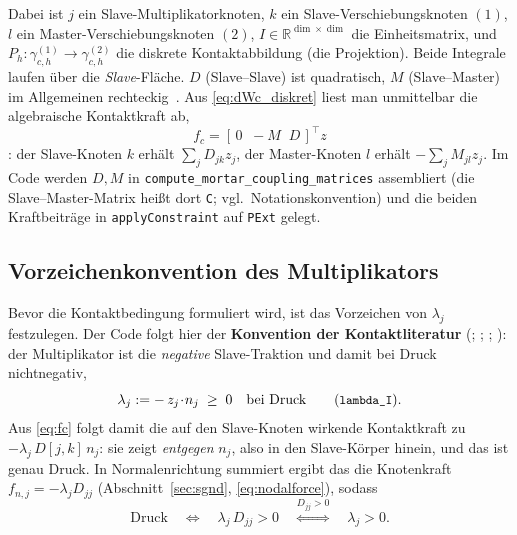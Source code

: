 \documentclass[a4paper,11pt]{article}
\def\bm#1{#1}%
\def\tilde#1{#1}%
\newcommand{\code}[1]{\texttt{\small #1}}
\begin{document}
Dabei ist $j$ ein Slave-Multiplikatorknoten, $k$ ein Slave-Verschiebungsknoten $(1)$, $l$ ein
Master-Verschiebungsknoten $(2)$, $\bm I\in\mathbb R^{\dim\times\dim}$ die Einheitsmatrix, und
$P_h:\gamma_{c,h}^{(1)}\!\to\!\gamma_{c,h}^{(2)}$ die diskrete Kontaktabbildung (die Projektion). Beide
Integrale laufen über die \emph{Slave}-Fläche. $\bm D$ (Slave--Slave) ist quadratisch, $\bm M$
(Slave--Master) im Allgemeinen rechteckig~\citep[S.~B427]{popp2012}. Aus \eqref{eq:dWc_diskret}
liest man unmittelbar die algebraische Kontaktkraft ab,
\begin{equation}
\bm f_c = [\,\bm 0\;\;-\bm M\;\;\bm D\,]^{\!\top}\bm z
\label{eq:fc}
\end{equation}
\citep[Gl.~(3.38)]{farah}: der Slave-Knoten $k$ erhält $\sum_j D_{jk}\bm z_j$, der Master-Knoten
$l$ erhält $-\sum_j M_{jl}\bm z_j$. Im Code werden $\bm D,\bm M$ in
\code{compute\_mortar\_coupling\_matrices} assembliert (die Slave--Master-Matrix heißt dort
\code{C}; vgl.\ Notationskonvention) und die beiden Kraftbeiträge in \code{applyConstraint} auf
\code{PExt} gelegt.

\subsection{Vorzeichenkonvention des Multiplikators}
\label{sec:vorzeichenkonvention}
Bevor die Kontaktbedingung formuliert wird, ist das Vorzeichen von $\lambda_j$ festzulegen. Der
Code folgt hier der \textbf{Konvention der Kontaktliteratur}
(\citealp{poppgeewall2009}; \citealp{gitterle}; \citealp{popp2012}; \citealp{farah}): der
Multiplikator ist die \emph{negative} Slave-Traktion und damit bei Druck nichtnegativ,
\begin{equation}
\lambda_j := -\,\bm z_j\!\cdot\!\bm n_j \;\ge\; 0 \quad\text{bei Druck}
\qquad (\code{lambda\_I}).
\label{eq:lambdaconv}
\end{equation}
Aus \eqref{eq:fc} folgt damit die auf den Slave-Knoten wirkende Kontaktkraft zu
$-\lambda_j\,\bm D[j,k]\,\bm n_j$: sie zeigt \emph{entgegen} $\bm n_j$, also in den Slave-Körper
hinein, und das ist genau Druck. In Normalenrichtung summiert ergibt das die Knotenkraft
$f_{n,j}=-\lambda_j\tilde D_{jj}$ (Abschnitt~\ref{sec:sgnd}, \eqref{eq:nodalforce}), sodass
\begin{equation}
\text{Druck}\quad\Longleftrightarrow\quad \lambda_j\,\tilde D_{jj} > 0
\quad\overset{\tilde D_{jj}>0}{\Longleftrightarrow}\quad \lambda_j>0 .
\label{eq:signconv}
\end{equation}
\end{document}
